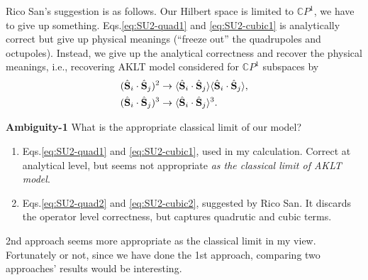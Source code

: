 \documentclass[11pt, aps, longbibliography]{article}
\begin{document}
Rico San's suggestion is as follows.
Our Hilbert space is limited to $\mathbb{C}P^1$, we have to give up something. 
Eqs.\eqref{eq:SU2-quad1} and \eqref{eq:SU2-cubic1} is analytically correct but give up physical meanings (“freeze out” the quadrupoles and octupoles).
Instead, we give up the analytical correctness and recover the physical meanings, i.e., recovering AKLT model considered for $\mathbb{C}P^1$ subspaces by
\begin{align}
    (\hat{\bold{S}}_i \cdot \hat{\bold{S}}_j)^2 &\rightarrow \langle \hat{\bold{S}}_i \cdot \hat{\bold{S}}_j \rangle \langle \hat{\bold{S}}_i \cdot \hat{\bold{S}}_j \rangle,  \label{eq:SU2-quad2} \\
    (\hat{\bold{S}}_i \cdot \hat{\bold{S}}_j)^3 &\rightarrow \langle \hat{\bold{S}}_i \cdot \hat{\bold{S}}_j \rangle^3.\label{eq:SU2-cubic2}
\end{align}


\begin{tcolorbox}
    \textbf{Ambiguity-1}
    What is the appropriate classical limit of our model?
    \begin{enumerate}
        \item Eqs.\eqref{eq:SU2-quad1} and \eqref{eq:SU2-cubic1}, used in my calculation. Correct at analytical level, but seems not appropriate \emph{as the classical limit of AKLT model}.
        \item Eqs.\eqref{eq:SU2-quad2} and \eqref{eq:SU2-cubic2}, suggested by Rico San. It discards the operator level correctness, but captures quadrutic and cubic terms.
    \end{enumerate}
\end{tcolorbox}

2nd approach seems more appropriate as the classical limit in my view. Fortunately or not, since we have done the 1st approach, comparing two approaches' results would be interesting.
\end{document}

